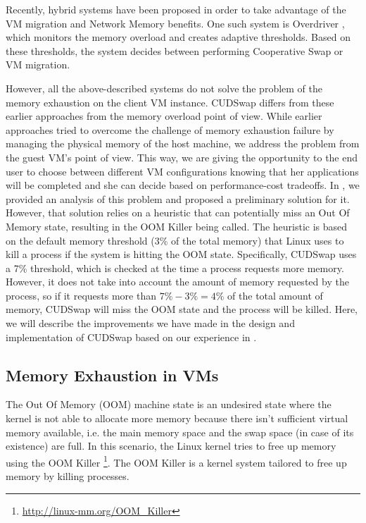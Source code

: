 Recently, hybrid systems have been proposed in order to take advantage of
the VM migration and Network Memory benefits. One such system is Overdriver
\cite{Williams2011}, which monitors the memory overload and creates
adaptive thresholds. Based on these thresholds, the system decides between
performing Cooperative Swap or VM migration.

However, all the above-described systems do not solve the problem of the
memory exhaustion on the client VM instance. CUDSwap differs from these
earlier approaches from the memory overload point of view. While earlier
approaches tried to overcome the challenge of memory exhaustion failure by
managing the physical memory of the host machine, we address the problem
from the guest VM's point of view. This way, we are giving the opportunity
to the end user to choose between different VM configurations knowing that
her applications will be completed and she can decide based on
performance-cost tradeoffs. In \cite{Molina2013dcdv},
we provided an analysis of this problem and proposed a preliminary
solution for it. However, that solution relies on a heuristic that can
potentially miss an Out Of Memory state, resulting in the OOM Killer being
called. The heuristic is based on the default memory threshold (3\% of the
total memory) that Linux  uses to kill a process if the system is hitting
the OOM state. Specifically, CUDSwap uses a 7\% threshold, which is checked
at the time a process requests more memory. However, it does not take into
account the amount of memory requested by the process, so if it requests
more than $7\% - 3\% = 4\%$ of the total amount of memory, CUDSwap will
miss the OOM state and the process will be killed. Here, we will describe
the improvements we have made in the design and implementation of CUDSwap
based on our experience in \cite{Molina2013dcdv}.

\subsection{Memory Exhaustion in VMs}\label{sub_cudswap_VMs}
The Out Of Memory (OOM) machine state is an undesired state where the
kernel is not able to allocate more memory because there isn't sufficient
virtual memory available, i.e. the main memory space and the swap space
(in case of its existence) are full. In this scenario, the Linux kernel
tries to free up memory using the OOM Killer \footnote{\url{http://linux-mm.org/OOM_Killer}}.
The OOM Killer is a kernel system tailored to free up memory by killing processes.

